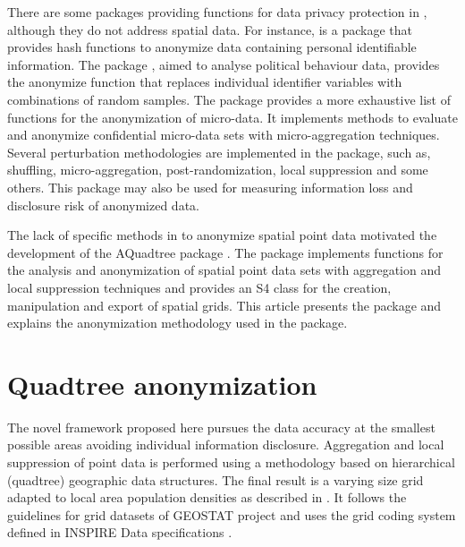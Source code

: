 There are some packages providing functions for data privacy protection in , although they do not address spatial data. For instance,  \citep{Hendricks2015} is a package that provides hash functions to anonymize data containing personal identifiable information. The  package \citep{Marcelino2013}, aimed to analyse political behaviour data, provides the anonymize function that replaces individual identifier variables with combinations of random samples. The package  \citep{Templ2015} provides a more exhaustive list of functions for the anonymization of micro-data. It implements methods to evaluate and anonymize confidential micro-data sets with micro-aggregation techniques. Several perturbation methodologies are implemented in the package, such as, shuffling, micro-aggregation, post-randomization, local suppression and some others. This package may also be used for measuring information loss and disclosure risk of anonymized data.

The lack of specific methods in  to anonymize spatial point data motivated the development of the AQuadtree package \citep{Lagonigro2020}. The package implements functions for the analysis and anonymization of spatial point data sets with aggregation and local suppression techniques and provides an S4  class for the creation, manipulation and export of spatial grids. This article presents the  package and explains the anonymization methodology used in the package.

\section{Quadtree anonymization} \label{sec:anonym} 

The novel framework proposed here pursues the data accuracy at the smallest possible areas avoiding individual information disclosure. Aggregation and local suppression of point data is performed using a methodology based on hierarchical (quadtree) geographic data structures. The final result is a varying size grid adapted to local area population densities as described in \cite{Lagonigro2017}. It follows the guidelines for grid datasets of GEOSTAT project \citep{GEOSTAT1B2014} and uses the grid coding system defined in INSPIRE Data specifications \citep{INSPIRE2010}.

